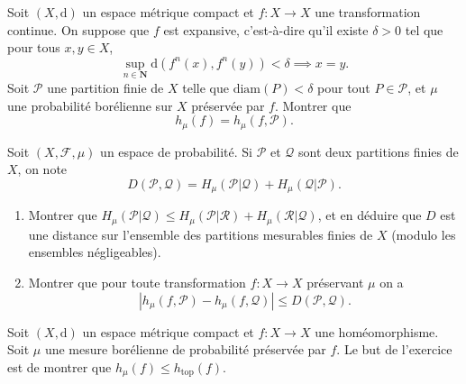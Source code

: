 \documentclass[a4paper,10pt,openany]{article}
\theoremstyle{plain}
\theoremstyle{definition}
\newcommand{\dd}{\mathrm{d}}
\newcommand{\N}{\mathbf{N}}
\begin{document}
\vspace{0.6cm}


 \vspace{1.5mm} 

\noindent Soit $(X,\dd)$ un espace m\'etrique compact et $f : X \to X$ une transformation continue. On suppose que $f$ est expansive, c'est-\`a-dire qu'il existe $\delta > 0$ tel que pour tous $x,y \in X$,
$$
\sup_{n \in \N} \dd(f^n(x), f^n(y)) < \delta \implies x = y.
$$
Soit $\mathcal{P}$ une partition finie de $X$ telle que $\mathrm{diam}(P) < \delta$ pour tout $P \in \mathcal{P}$, et $\mu$ une probabilit\'e bor\'elienne sur $X$ pr\'eserv\'ee par $f$. Montrer que 
$$
h_\mu(f) = h_\mu(f, \mathcal{P}).
$$

\vspace{0.6cm}

 \vspace{1.5mm}

\noindent Soit $(X, \mathcal{F}, \mu)$ un espace de probabilit\'e. Si $\mathcal{P}$ et $\mathcal{Q}$ sont deux partitions finies de $X$, on note
$$
D(\mathcal{P}, \mathcal{Q}) = H_\mu(\mathcal{P}|\mathcal{Q}) + H_\mu(\mathcal{Q}|\mathcal{P}).
$$

\begin{enumerate}
\item Montrer que $H_\mu(\mathcal{P}|\mathcal{Q}) \leq H_\mu(\mathcal{P}|\mathcal{R}) + H_\mu(\mathcal{R}|\mathcal{Q})$, et en d\'eduire que $D$ est une distance sur l'ensemble des partitions mesurables finies de $X$ (modulo les ensembles n\'egligeables).
\item Montrer que pour toute transformation $f : X \to X$ pr\'eservant $\mu$ on a
$$
\left|h_\mu(f, \mathcal{P}) - h_\mu(f, \mathcal{Q})\right| \leq D(\mathcal{P}, \mathcal{Q}).
$$
\end{enumerate}
\vspace{0.6cm}

 \vspace{1.5mm} 

\noindent Soit $(X, \dd)$ un espace m\'etrique compact et $f : X \to X$ une hom\'eomorphisme. Soit $\mu$ une mesure bor\'elienne de probabilit\'e pr\'eserv\'ee par $f$. Le but de l'exercice est de montrer que $h_\mu(f) \leq h_\mathrm{top}(f)$.
\end{document}
